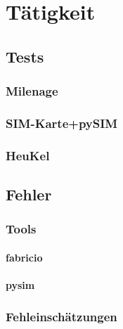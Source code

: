 \section{Tätigkeit} %
	\subsection{Tests}
		\subsubsection{Milenage}
		\subsubsection{SIM-Karte+pySIM}
		\subsubsection{HeuKel}
	\subsection{Fehler}
		\subsubsection{Tools}
			\paragraph{fabricio}
			\paragraph{pysim}
		\subsubsection{Fehleinschätzungen}
\clearpage